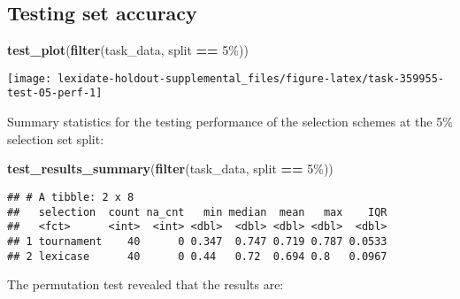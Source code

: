 \documentclass[
]{book}
\newenvironment{Shaded}{\begin{snugshade}}{\end{snugshade}}
\newcommand{\AttributeTok}[1]{\textcolor[rgb]{0.13,0.29,0.53}{#1}}
\newcommand{\DecValTok}[1]{\textcolor[rgb]{0.00,0.00,0.81}{#1}}
\newcommand{\FunctionTok}[1]{\textcolor[rgb]{0.13,0.29,0.53}{\textbf{#1}}}
\newcommand{\NormalTok}[1]{#1}
\newcommand{\OtherTok}[1]{\textcolor[rgb]{0.56,0.35,0.01}{#1}}
\newcommand{\SpecialCharTok}[1]{\textcolor[rgb]{0.81,0.36,0.00}{\textbf{#1}}}
\newcommand{\StringTok}[1]{\textcolor[rgb]{0.31,0.60,0.02}{#1}}
\begin{document}
\hypertarget{testing-set-accuracy-10}{%
\subsection{Testing set accuracy}\label{testing-set-accuracy-10}}

\begin{Shaded}
\begin{Highlighting}[]
\FunctionTok{test\_plot}\NormalTok{(}\FunctionTok{filter}\NormalTok{(task\_data, split }\SpecialCharTok{==} \StringTok{\textquotesingle{}5\%\textquotesingle{}}\NormalTok{))}
\end{Highlighting}
\end{Shaded}

\texttt{[image: lexidate-holdout-supplemental\_files/figure-latex/task-359955-test-05-perf-1]}

Summary statistics for the testing performance of the selection schemes at the 5\% selection set split:

\begin{Shaded}
\begin{Highlighting}[]
\FunctionTok{test\_results\_summary}\NormalTok{(}\FunctionTok{filter}\NormalTok{(task\_data, split }\SpecialCharTok{==} \StringTok{\textquotesingle{}5\%\textquotesingle{}}\NormalTok{))}
\end{Highlighting}
\end{Shaded}

\begin{verbatim}
## # A tibble: 2 x 8
##   selection  count na_cnt   min median  mean   max    IQR
##   <fct>      <int>  <int> <dbl>  <dbl> <dbl> <dbl>  <dbl>
## 1 tournament    40      0 0.347  0.747 0.719 0.787 0.0533
## 2 lexicase      40      0 0.44   0.72  0.694 0.8   0.0967
\end{verbatim}

The permutation test revealed that the results are:

\begin{Shaded}
\end{Shaded}
\end{document}
